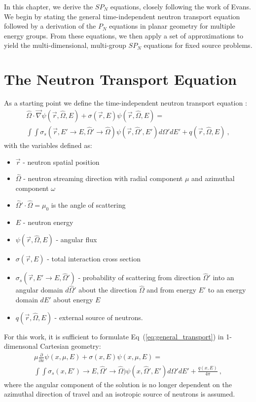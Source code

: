 In this chapter, we derive the $SP_N$ equations, closely following the
work of Evans. We begin by stating the general time-independent
neutron transport equation followed by a derivation of the $P_N$
equations in planar geometry for multiple energy groups. From these
equations, we then apply a set of approximations to yield the
multi-dimensional, multi-group $SP_N$ equations for fixed source
problems.

\section{The Neutron Transport Equation}
\label{sec:transport_eq}
As a starting point we define the time-independent neutron transport
equation \citep{lewis_computational_1993}:
\begin{multline}
  \hat{\Omega} \cdot \vec{\nabla} \psi(\vec{r},\hat{\Omega},E) +
  \sigma(\vec{r},E) \psi(\vec{r},\hat{\Omega},E) = \\ \int \int
  \sigma_s(\vec{r},E' \rightarrow E,\hat{\Omega}' \rightarrow
  \hat{\Omega}) \psi(\vec{r},\hat{\Omega}',E') d\Omega' dE' +
  q(\vec{r},\hat{\Omega},E)\:,
  \label{eq:general_transport}
\end{multline}
with the variables defined as:
\begin{itemize}
\item $\vec{r}$ - neutron spatial position
\item $\hat{\Omega}$ - neutron streaming direction with radial
  component $\mu$ and azimuthal component $\omega$
\item $\hat{\Omega}' \cdot \hat{\Omega} = \mu_0$ is the angle of
  scattering
\item $E$ - neutron energy
\item $\psi(\vec{r},\hat{\Omega},E)$ - angular flux
\item $\sigma(\vec{r},E)$ - total interaction cross section
\item $\sigma_s(\vec{r},E' \rightarrow E,\hat{\Omega}')$ - probability
  of scattering from direction $\hat{\Omega}'$ into an angular domain
  $d\hat{\Omega}'$ about the direction $\hat{\Omega}$ and from energy
  $E'$ to an energy domain $dE'$ about energy $E$
\item $q(\vec{r},\hat{\Omega},E)$ - external source of neutrons.
\end{itemize}
For this work, it is sufficient to formulate
Eq~(\ref{eq:general_transport}) in 1-dimensonal Cartesian geometry:
\begin{multline}
  \mu \frac{\partial}{\partial x} \psi(x,\mu,E) + \sigma(x,E)
  \psi(x,\mu,E) = \\ \int \int \sigma_s(x,E') \rightarrow
  E,\hat{\Omega}' \rightarrow \hat{\Omega}) \psi(x,\hat{\Omega}',E')
  d\Omega' dE' + \frac{q(x,E)}{4 \pi}\:,
  \label{eq:cart_1d_transport}
\end{multline}
where the angular component of the solution is no longer dependent on
the azimuthal direction of travel and an isotropic source of neutrons
is assumed.

